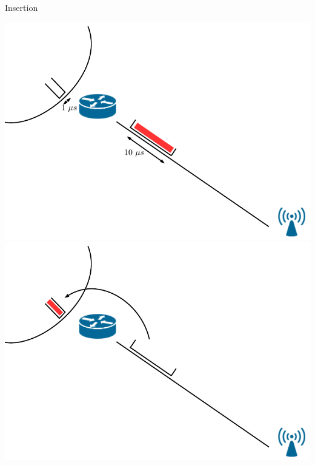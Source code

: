 \documentclass[10 pt]{beamer}
\begin{document}
\begin{frame}{Insertion}


\begin{center}
\includegraphics[scale=0.4]{slot1.pdf}
\hspace{1cm}
\includegraphics[scale=0.4]{slot2.pdf}

\end{center}

\end{frame}
\end{document}
